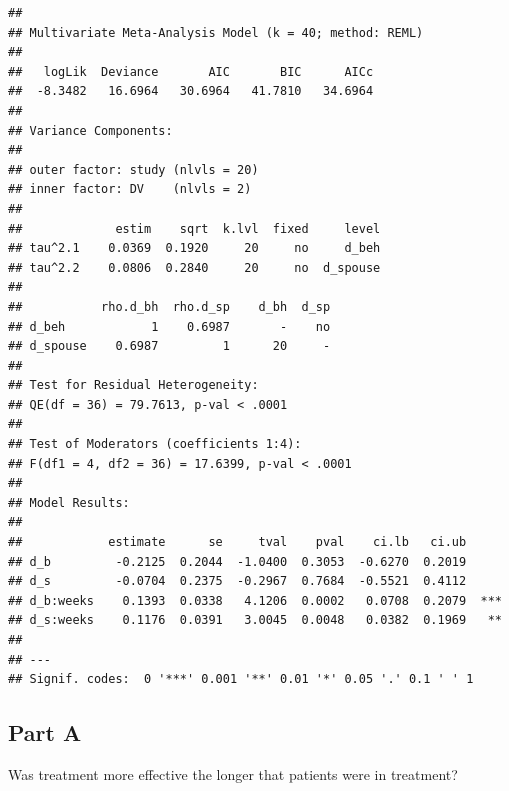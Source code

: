 \documentclass[]{article}
\newenvironment{Shaded}{\begin{snugshade}}{\end{snugshade}}
\newcommand{\KeywordTok}[1]{\textcolor[rgb]{0.13,0.29,0.53}{\textbf{#1}}}
\newcommand{\DataTypeTok}[1]{\textcolor[rgb]{0.13,0.29,0.53}{#1}}
\newcommand{\DecValTok}[1]{\textcolor[rgb]{0.00,0.00,0.81}{#1}}
\newcommand{\StringTok}[1]{\textcolor[rgb]{0.31,0.60,0.02}{#1}}
\newcommand{\OperatorTok}[1]{\textcolor[rgb]{0.81,0.36,0.00}{\textbf{#1}}}
\newcommand{\NormalTok}[1]{#1}
\begin{document}
\begin{verbatim}
## 
## Multivariate Meta-Analysis Model (k = 40; method: REML)
## 
##   logLik  Deviance       AIC       BIC      AICc 
##  -8.3482   16.6964   30.6964   41.7810   34.6964   
## 
## Variance Components:
## 
## outer factor: study (nlvls = 20)
## inner factor: DV    (nlvls = 2)
## 
##             estim    sqrt  k.lvl  fixed     level 
## tau^2.1    0.0369  0.1920     20     no     d_beh 
## tau^2.2    0.0806  0.2840     20     no  d_spouse 
## 
##           rho.d_bh  rho.d_sp    d_bh  d_sp 
## d_beh            1    0.6987       -    no 
## d_spouse    0.6987         1      20     - 
## 
## Test for Residual Heterogeneity:
## QE(df = 36) = 79.7613, p-val < .0001
## 
## Test of Moderators (coefficients 1:4):
## F(df1 = 4, df2 = 36) = 17.6399, p-val < .0001
## 
## Model Results:
## 
##            estimate      se     tval    pval    ci.lb   ci.ub 
## d_b         -0.2125  0.2044  -1.0400  0.3053  -0.6270  0.2019      
## d_s         -0.0704  0.2375  -0.2967  0.7684  -0.5521  0.4112      
## d_b:weeks    0.1393  0.0338   4.1206  0.0002   0.0708  0.2079  *** 
## d_s:weeks    0.1176  0.0391   3.0045  0.0048   0.0382  0.1969   ** 
## 
## ---
## Signif. codes:  0 '***' 0.001 '**' 0.01 '*' 0.05 '.' 0.1 ' ' 1
\end{verbatim}

\subsection{Part A}\label{part-a-3}

Was treatment more effective the longer that patients were in treatment?

\begin{Shaded}
\end{Shaded}
\end{document}
